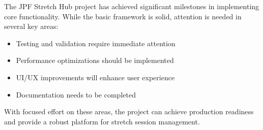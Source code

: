 \begin{tcolorbox}[
    enhanced,
    title={Project Status Summary},
    attach boxed title to top left,
    boxed title style={
        colback=info!50,
        colframe=info!50,
        arc=0mm,
    },
    colback=white,
    colframe=info!50,
    arc=0mm,
    fonttitle=\bfseries
]
    The JPF Stretch Hub project has achieved significant milestones in implementing core functionality. While the basic framework is solid, attention is needed in several key areas:
    
    \begin{itemize}
        \item Testing and validation require immediate attention
        \item Performance optimizations should be implemented
        \item UI/UX improvements will enhance user experience
        \item Documentation needs to be completed
    \end{itemize}
    
    With focused effort on these areas, the project can achieve production readiness and provide a robust platform for stretch session management.
\end{tcolorbox}
